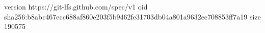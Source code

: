 version https://git-lfs.github.com/spec/v1
oid sha256:b8abc467ecc688af860e203f5b9462fe31703db04a801a9632ec708853ff7a19
size 190575
